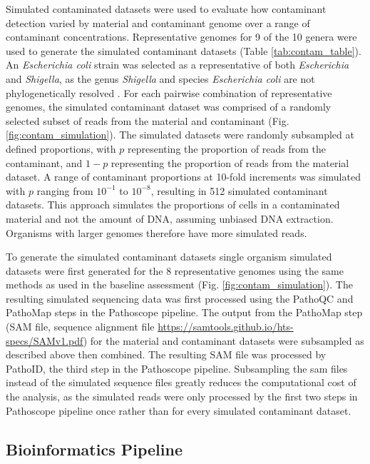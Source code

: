 \documentclass[fleqn,10pt,lineno]{wlpeerj}\usepackage[]{graphicx}\usepackage[]{color}
\begin{document}
Simulated contaminated datasets were used to evaluate how contaminant detection varied by material and contaminant genome over a range of contaminant concentrations.
Representative genomes for 9 of the 10 genera were used to generate the simulated contaminant datasets (Table \ref{tab:contam_table}).
An \textit{Escherichia coli} strain was selected as a representative of both \textit{Escherichia} and \textit{Shigella}, as the genus \textit{Shigella} and species \textit{Escherichia coli} are not phylogenetically resolved \citep{lan2002escherichia}.
For each pairwise combination of representative genomes, the simulated contaminant dataset was comprised of a randomly selected subset of reads from the material and contaminant (Fig. \ref{fig:contam_simulation}).
The simulated datasets were randomly subsampled at defined proportions, with $p$ representing the proportion of reads from the contaminant, and $1-p$ representing the proportion of reads from the material dataset.
A range of contaminant proportions at 10-fold increments was simulated with $p$ ranging from $10^{-1}$ to $10^{-8}$, resulting in 512 simulated contaminant datasets.
This approach simulates the proportions of cells in a contaminated material and not the amount of DNA, assuming unbiased DNA extraction. 
Organisms with larger genomes therefore have more simulated reads.  


To generate the simulated contaminant datasets single organism simulated datasets were first generated for the 8 representative genomes using the same methods as used in the baseline assessment (Fig. \ref{fig:contam_simulation}).
The resulting simulated sequencing data was first processed using the PathoQC and PathoMap steps in the Pathoscope pipeline.
The output from the PathoMap step (SAM file, sequence alignment file \url{https://samtools.github.io/hts-specs/SAMv1.pdf}) for the material and contaminant datasets were subsampled as described above then combined. 
The resulting SAM file was processed by PathoID, the third step in the Pathoscope pipeline.
Subsampling the sam files instead of the simulated sequence files greatly reduces the computational cost of the analysis, as the simulated reads were only processed by the first two steps in Pathoscope pipeline once rather than for every simulated contaminant dataset.


\subsection*{Bioinformatics Pipeline}
\end{document}
